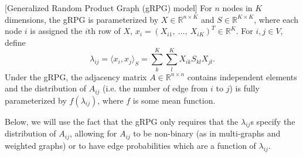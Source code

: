 \documentclass[twoside,11pt]{article}
\begin{document}
\begin{definition}
\label{def:gRPG}
[Generalized Random Product Graph (gRPG) model] 
For $n$ nodes in $K$ dimensions, the gRPG is parameterized by $X \in \mathds{R}^{n \times K}$ and $S \in \mathds{R}^{K \times K}$, where each node $i$ is assigned the $i$th row of $X$, $x_i = (X_{i1},\ \dots,\ X_{iK})^T \in \mathds{R}^K$.  
For $i,j \in V$, define 
\[\lambda_{ij} = \langle x_i,x_j \rangle _S = \sum_k^K \sum_l^K X_{ik} S_{kl} X_{jl}.\]
Under the gRPG, the adjacency matrix $A\in \mathds{R}^{n\times n}$ contains independent elements and the distribution of $A_{ij}$ (i.e. the number of edge from $i$ to $j$) is fully parameterized by $f(\lambda_{ij})$, where $f$ is some mean function.
\end{definition}
Below, we will use the fact that the gRPG only requires that the $\lambda_{ij}$s specify the distribution of $A_{ij}$, allowing for $A_{ij}$ to be non-binary (as in multi-graphs and  weighted graphs) or to have edge probabilities which are a function of $\lambda_{ij}$.  




\end{document}
